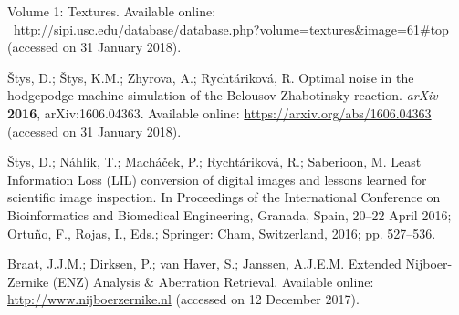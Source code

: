 \documentclass[entropy,article,accept,moreauthors,pdftex,10pt,a4paper]{mdpi}
\begin{document}
\begin{thebibliography}{00}

 


 {Volume 1: Textures. Available online:}
~\url{http://sipi.usc.edu/database/database.php?volume=textures\&image=61\#top} {(accessed on 31 January 2018).}

 

 

 \v{S}tys, D.; \v{S}tys, K.M.; Zhyrova, A.; Rycht\'{a}rikov\'{a}, R. Optimal noise in the hodgepodge machine simulation of the Belousov-Zhabotinsky reaction. \emph{arXiv} \textbf{2016}, arXiv:1606.04363. Available online: \url{https://arxiv.org/abs/1606.04363} (accessed on 31 January 2018).

 \v{S}tys, D.; N\'{a}hl\'{i}k, T.; Mach\'{a}\v{c}ek, P.; Rycht\'{a}rikov\'{a}, R.; Saberioon, M. Least Information Loss (LIL) conversion of digital images and lessons learned for scientific image inspection. In Proceedings of the International Conference on Bioinformatics and Biomedical Engineering, Granada, Spain, 20--22 April 2016; Ortu\~{n}o, F., Rojas, I., Eds.; Springer: Cham, Switzerland, 2016; pp. 527--536.

 Braat, J.J.M.; Dirksen, P.; van Haver, S.; Janssen, A.J.E.M. Extended Nijboer-Zernike (ENZ) Analysis \& Aberration Retrieval. Available online: \url{http://www.nijboerzernike.nl} (accessed on 12 December 2017).


\end{thebibliography}
\end{document}
